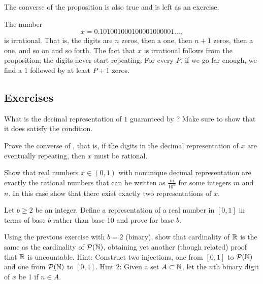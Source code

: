 The converse of the proposition is also true and is left as an exercise.

\begin{example}
The number
\begin{equation*}
x = 0.101001000100001000001\ldots,
\end{equation*}
is irrational.
That is, the digits are $n$ zeros, then a one, then $n+1$
zeros, then a one, and so on and so forth.
The fact that $x$ is irrational follows from the
proposition; the digits never start repeating.
For every $P$,
if we go far enough, we find a 1 followed by at least $P+1$ zeros.
\end{example}

\subsection{Exercises}

\begin{exercise}[Easy]
What is the decimal representation of $1$ guaranteed by
?  Make sure to show that it does satisfy
the condition.
\end{exercise}

\begin{exercise}
Prove the converse of , that is,
if the digits in the decimal representation of $x$ are eventually repeating, then 
$x$ must be rational.
\end{exercise}

\begin{exercise} \label{exercise:nonuniquedecimals}
Show that real numbers $x \in (0,1)$ with nonunique decimal representation
are exactly the rational numbers that can be written
as $\frac{m}{10^n}$ for some integers $m$ and $n$.  In this case show that
there exist exactly two representations of $x$.
\end{exercise}

\begin{exercise} \label{exercise:decimalpropbaseb}
Let $b \geq 2$ be an integer.  Define a representation of a real number in
$[0,1]$ in terms of base $b$ rather than base 10 and prove
 for base $b$.
\end{exercise}

\begin{exercise}
Using the previous exercise with $b=2$ (binary), 
show that cardinality of ${\mathbb{R}}$ is the same as the cardinality of ${\mathcal{P}}({\mathbb{N}})$,
obtaining yet another (though related) proof that ${\mathbb{R}}$ is uncountable.
Hint: Construct two injections, one from $[0,1]$ to ${\mathcal{P}}({\mathbb{N}})$
and one from ${\mathcal{P}}({\mathbb{N}})$ to $[0,1]$.  Hint 2: Given a
set $A \subset {\mathbb{N}}$, let the $n$th binary digit of $x$ be 1 if $n\in A$.
\end{exercise}

